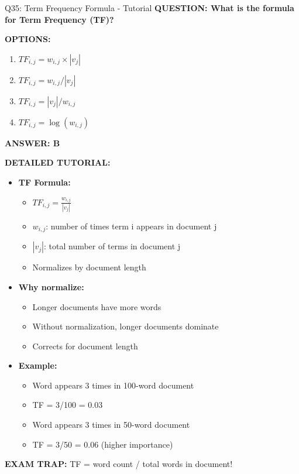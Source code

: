 \documentclass[8pt]{beamer}
\begin{document}
	\begin{frame}{Q35: Term Frequency Formula - Tutorial}
		\fontsize{6.5}{7.5}\selectfont
		\textbf{QUESTION: What is the formula for Term Frequency (TF)?}
		
		\vspace{0.1cm}
		\textbf{OPTIONS:}
		\begin{enumerate}
			\item $TF_{i,j} = w_{i,j} \times |v_j|$
			\item $TF_{i,j} = w_{i,j} / |v_j|$
			\item $TF_{i,j} = |v_j| / w_{i,j}$
			\item $TF_{i,j} = \log(w_{i,j})$
		\end{enumerate}
		
		\vspace{0.1cm}
		\textcolor{myblue}{\textbf{ANSWER: B}}
		
		\vspace{0.1cm}
		\textbf{DETAILED TUTORIAL:}
		\begin{itemize}
			\item \textbf{TF Formula:}
			\begin{itemize}
				\item $TF_{i,j} = \frac{w_{i,j}}{|v_j|}$
				\item $w_{i,j}$: number of times term i appears in document j
				\item $|v_j|$: total number of terms in document j
				\item Normalizes by document length
			\end{itemize}
			\item \textbf{Why normalize:}
			\begin{itemize}
				\item Longer documents have more words
				\item Without normalization, longer documents dominate
				\item Corrects for document length
			\end{itemize}
			\item \textbf{Example:}
			\begin{itemize}
				\item Word appears 3 times in 100-word document
				\item TF = 3/100 = 0.03
				\item Word appears 3 times in 50-word document
				\item TF = 3/50 = 0.06 (higher importance)
			\end{itemize}
		\end{itemize}
		
		\textcolor{myred}{\textbf{EXAM TRAP:}} TF = \textcolor{myblue}{word count / total words in document}!
	\end{frame}
	
\end{document}
